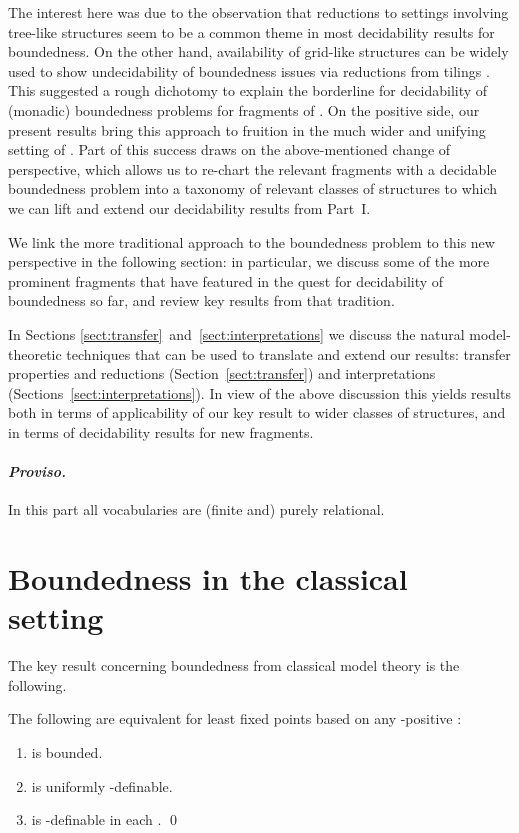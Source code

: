 \documentclass{LMCS}
\begin{document}
The interest here was due to the observation
that reductions to settings involving tree-like structures seem to
be a common theme in most decidability results for boundedness.
On the other hand, availability of grid-like structures can
be widely used to show undecidability of boundedness issues via
reductions from tilings \cite{KOunpub}.
This suggested a rough dichotomy to
explain the borderline for decidability of (monadic)
boundedness problems for fragments of .
On the positive side, our present results bring this approach
to fruition in the much wider and unifying setting of .
Part of this success draws on the above-mentioned
change of perspective, which allows us to re-chart the
relevant fragments with a decidable boundedness problem
into a taxonomy of relevant classes of structures
to which we can lift and extend our decidability results
from Part~I.


We link the more traditional approach to
the boundedness problem to this new perspective
in the following section\?: in particular, we discuss some of
the more prominent fragments that have featured in the quest
for decidability of boundedness so far, and review key results
from that tradition.

In Sections \ref{sect:transfer}~and~\ref{sect:interpretations} we discuss the natural model-theoretic
techniques that can be used to translate and extend our results\?:
transfer properties and reductions (Section~\ref{sect:transfer})
and interpretations (Sections~\ref{sect:interpretations}).
In view of the above discussion this yields results both
in terms of applicability of our key result to
wider classes of structures, and in terms of decidability results
for new fragments.

\medskip
\paragraph*{\itshape Proviso.}
In this part all vocabularies are (finite and) purely relational.


\section{Boundedness in the classical setting}
\label{sect:classical boundedness}
\label{sect:start II}

The key result concerning boundedness from classical
model theory is the following.

\begin{thm}
\label{thm:BMthm}
The following are equivalent for least fixed points
based on any -positive \?:
\begin{enumerate}
\item  is bounded.
\item  is uniformly -definable.
\item  is -definable in each .
\qed\end{enumerate}
\end{thm}
\end{document}
